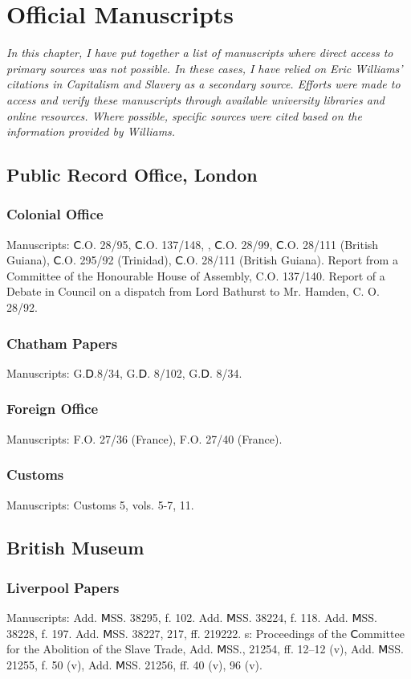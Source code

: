 \chapter*{Official Manuscripts}
\textit{In this chapter, I have put together a list of manuscripts where direct access to primary sources was not possible. In these cases, I have relied on Eric Williams' citations in Capitalism and Slavery as a secondary source. Efforts were made to access and verify these manuscripts through available university libraries and online resources. Where possible, specific sources were cited based on the information provided by Williams.}
\section{Public Record Office, London}
\subsection{Colonial Office}
Manuscripts: Ⅽ.O. 28/95, Ⅽ.O. 137/148, , Ⅽ.O. 28/99, Ⅽ.O. 28/111 (British Guiana), Ⅽ.O. 295/92 (Trinidad), Ⅽ.O. 28/111 (British Guiana). Report from a Committee of the Honourable House of Assembly, C.O. 137/140. Report of a Debate in Council on a dispatch from Lord Bathurst to Mr. Hamden, C. O. 28/92.
\subsection{Chatham Papers}
Manuscripts: G.Ⅾ.8/34, G.Ⅾ. 8/102, G.Ⅾ. 8/34.
\subsection{Foreign Office}
Manuscripts: F.O. 27/36 (France), F.O. 27/40 (France).
\subsection{Customs}
Manuscripts: Customs 5, vols. 5-7, 11.
\section{British Museum}
\subsection{Liverpool Papers}
Manuscripts: Add. ⅯSS. 38295, f. 102. Add. ⅯSS. 38224, f. 118. Add. ⅯSS. 38228, f. 197. Add. ⅯSS. 38227, 217, ff. 219222. s: Proceedings of the Ⅽommittee for the Abolition of the Slave Trade, Add. ⅯSS., 21254, ff. 12–12 (v), Add. ⅯSS. 21255, f. 50 (v), Add. ⅯSS. 21256, ff. 40 (v), 96 (v). 
